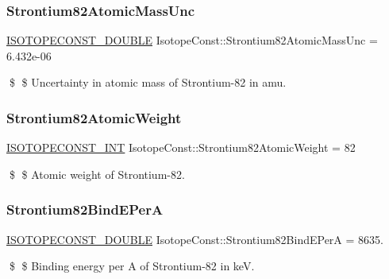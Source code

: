 \subsubsection{\texorpdfstring{Strontium82\+Atomic\+Mass\+Unc}{Strontium82AtomicMassUnc}}
{\footnotesize\ttfamily \mbox{\hyperlink{group___isotope_const-_macros_ga8f45a7272ce02c0b4c65c44636ed719a}{I\+S\+O\+T\+O\+P\+E\+C\+O\+N\+S\+T\+\_\+\+D\+O\+U\+B\+LE}} Isotope\+Const\+::\+Strontium82\+Atomic\+Mass\+Unc = 6.\+432e-\/06}

\$ \$ Uncertainty in atomic mass of Strontium-\/82 in amu. \mbox{\label{group___isotope_const-_strontium-_sr82_ga9300c3d1252e8798bdc962376fafd256}} 
\subsubsection{\texorpdfstring{Strontium82\+Atomic\+Weight}{Strontium82AtomicWeight}}
{\footnotesize\ttfamily \mbox{\hyperlink{group___isotope_const-_macros_ga5f18360b3e99483a35c32d789e62621c}{I\+S\+O\+T\+O\+P\+E\+C\+O\+N\+S\+T\+\_\+\+I\+NT}} Isotope\+Const\+::\+Strontium82\+Atomic\+Weight = 82}

\$ \$ Atomic weight of Strontium-\/82. \mbox{\label{group___isotope_const-_strontium-_sr82_ga5d2f9fbd19357e9c3efcebf5f0a36bf9}} 
\subsubsection{\texorpdfstring{Strontium82\+Bind\+E\+PerA}{Strontium82BindEPerA}}
{\footnotesize\ttfamily \mbox{\hyperlink{group___isotope_const-_macros_ga8f45a7272ce02c0b4c65c44636ed719a}{I\+S\+O\+T\+O\+P\+E\+C\+O\+N\+S\+T\+\_\+\+D\+O\+U\+B\+LE}} Isotope\+Const\+::\+Strontium82\+Bind\+E\+PerA = 8635.}

\$ \$ Binding energy per A of Strontium-\/82 in keV. \mbox{\label{group___isotope_const-_strontium-_sr82_gadfd639c5c3882cb288386da14576736d}} 
